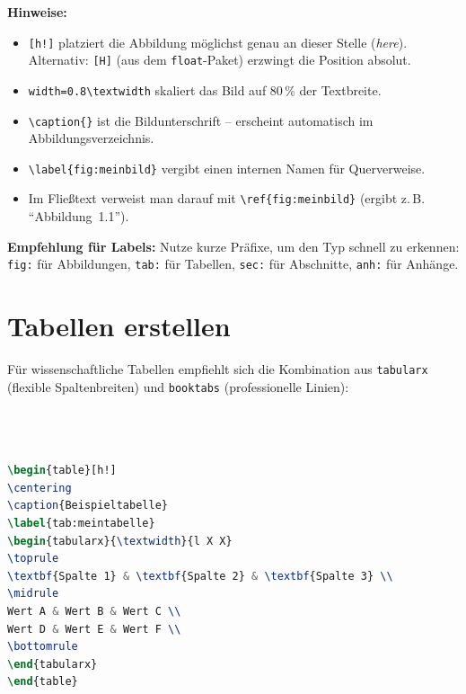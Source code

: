\textbf{Hinweise:}
\begin{itemize}
    \item \texttt{[h!]} platziert die Abbildung möglichst genau an dieser Stelle (\textit{here}).
    Alternativ: \texttt{[H]} (aus dem \texttt{float}-Paket) erzwingt die Position absolut.
    \item \texttt{width=0.8\textbackslash textwidth} skaliert das Bild auf 80\,\% der Textbreite.
    \item \texttt{\textbackslash caption\{\}} ist die Bildunterschrift – erscheint automatisch im Abbildungsverzeichnis.
    \item \texttt{\textbackslash label\{fig:meinbild\}} vergibt einen internen Namen für Querverweise.
    \item Im Fließtext verweist man darauf mit \texttt{\textbackslash ref\{fig:meinbild\}} (ergibt z.\,B. \enquote{Abbildung~1.1}).
\end{itemize}

\textbf{Empfehlung für Labels:} Nutze kurze Präfixe, um den Typ schnell zu erkennen:
\texttt{fig:} für Abbildungen, \texttt{tab:} für Tabellen, \texttt{sec:} für Abschnitte, \texttt{anh:} für Anhänge.

\section{Tabellen erstellen}
\label{sec:tabellen}

Für wissenschaftliche Tabellen empfiehlt sich die Kombination aus \texttt{tabularx} (flexible Spaltenbreiten) und \texttt{booktabs} (professionelle Linien):
\\
\\
\\
\\
\begin{lstlisting}[language=tex]
\begin{table}[h!]
\centering
\caption{Beispieltabelle}
\label{tab:meintabelle}
\begin{tabularx}{\textwidth}{l X X}
\toprule
\textbf{Spalte 1} & \textbf{Spalte 2} & \textbf{Spalte 3} \\
\midrule
Wert A & Wert B & Wert C \\
Wert D & Wert E & Wert F \\
\bottomrule
\end{tabularx}
\end{table}
\end{lstlisting}

